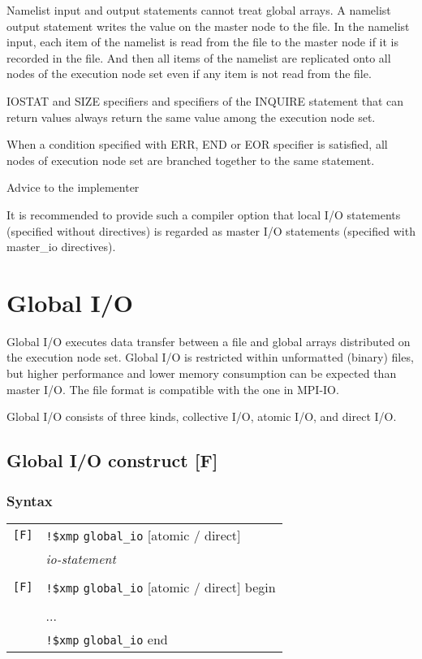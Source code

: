   Namelist input and output statements cannot treat global arrays.
   A namelist output statement writes the value on the master node to
   the file.
   In the namelist input, each item of the namelist is read from the
   file to the master node if it is recorded in the file.
   And then all items of the namelist are replicated onto all nodes of
   the execution node set even if any item is not read from the file.

   IOSTAT and SIZE specifiers and specifiers of the INQUIRE statement
   that can return values always return the same value among the
   execution node set.

   When a condition specified with ERR, END or EOR specifier is
   satisfied, all nodes of execution node set are branched together to
   the same statement.

   Advice to the implementer

   It is recommended to provide such a compiler option that local I/O
   statements (specified without directives) is regarded as master I/O
   statements (specified with master\_io directives).

   \clearpage
   
   \section{Global I/O}

   Global I/O executes data transfer between a file and global arrays
   distributed on the execution node set.
   Global I/O is restricted within unformatted (binary) files, but
   higher performance and lower memory consumption can be expected than
   master I/O.
   The file format is compatible with the one in MPI-IO.

   Global I/O consists of three kinds, collective I/O, atomic I/O, and
   direct I/O. 

   \subsection{Global I/O construct [F]}
   \subsubsection*{Syntax}

   \begin{tabular}{ll}
   \verb![F]! & \verb|!$xmp| {\tt \verb|global_io|} [atomic / direct] \\
   & \hspace{5mm} {\it io-statement} \\
   & \\
   \verb![F]! & \verb|!$xmp| {\tt \verb|global_io|} [atomic / direct] begin \\
   & \hspace{5mm}{\it io-statement} \\
   & \hspace{5mm}... \\
   & \verb|!$xmp| {\tt \verb|global_io|} end \\
   \end{tabular}

